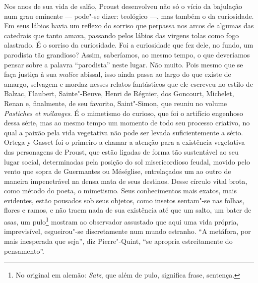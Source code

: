 Nos anos de sua vida de salão, Proust desenvolveu não só o vício da
bajulação num grau eminente --- pode"-se dizer: teológico ---, mas também o
da curiosidade. Em seus lábios havia um reflexo do sorriso que perpassa nos arcos de algumas das catedrais que tanto amava, passando pelos lábios das virgens tolas como fogo alastrado. É o sorriso da curiosidade.  Foi a curiosidade que fez dele, no fundo, um parodista tão grandioso? Assim, saberíamos, ao mesmo tempo, o que deveríamos pensar sobre a palavra ``parodista'' neste lugar. Não muito. Pois mesmo que se faça justiça à sua \emph{malice} abissal, isso ainda passa ao largo do que existe de amargo, selvagem e mordaz nesses relatos fantásticos que ele escreveu no estilo
de Balzac, Flaubert, Sainte"-Beuve, Henri de Régnier, dos Goncourt,
Michelet, Renan e, finalmente, de seu favorito, Saint"-Simon, que reuniu no
volume \emph{Pastiches et mélanges}. É o mimetismo do curioso, que foi o
artifício engenhoso dessa série, mas ao mesmo tempo um momento de todo
seu processo criativo, no qual a paixão pela vida vegetativa não pode
ser levada suficientemente a sério. Ortega y Gasset foi o primeiro a
chamar a atenção para a existência vegetativa das personagens de Proust,
que estão ligadas de forma tão sustentável ao seu lugar social,
determinadas pela posição do sol misericordioso feudal, movido pelo
vento que sopra de Guermantes ou Méséglise, entrelaçados um ao outro de
maneira impenetrável na densa mata de seus destinos. Desse círculo vital
brota, como método do poeta, o mimetismo. Seus conhecimentos mais exatos,
mais evidentes, estão pousados sob seus objetos, como insetos
sentam"-se nas folhas, flores e ramos, e não traem nada de sua
existência até que um salto, um bater de asas, um pulo\footnote{No
  original em alemão: \emph{Satz}, que além de pulo, significa frase, sentença. \versal{[N.~T.]}}
mostram ao observador assustado que aqui uma vida própria, imprevisível,
esgueirou"-se discretamente num mundo estranho. ``A metáfora, por
mais inesperada que seja'', diz Pierre"-Quint, ``se apropria
estreitamente do pensamento''.

